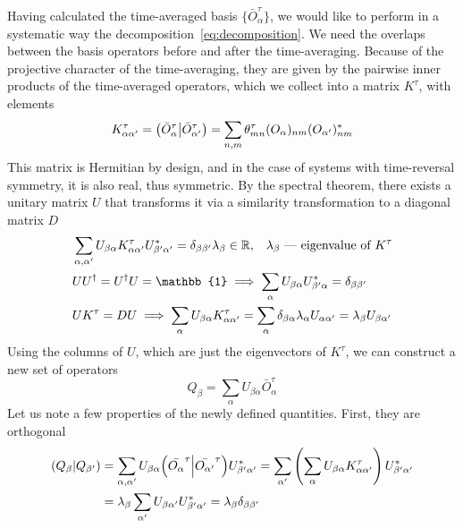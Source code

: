 Having calculated the time-averaged basis \( \{\bar{O}_{\alpha}^{\tau}\} \), we would like to perform in a 
systematic way the decomposition~\ref{eq:decomposition}. We need the overlaps between the basis operators
before and after the time-averaging. Because of the projective character of the time-averaging, they are
given by the pairwise inner products of the time-averaged operators, which we collect into a matrix
\(K^{\tau}\), with elements
\begin{equation}
    K^{\tau}_{\alpha\alpha^{\prime}} = \left(\bar{O}_{\alpha}^{\tau} \middle| \bar{O}_{\alpha^{\prime}}^{\tau}\right) = \sum_{n,m} \theta_{mn}^{\tau} (O_{\alpha})_{nm} (O_{\alpha^{\prime}})_{nm}^{\ast}
    \label{eq:overlap_matrix}
\end{equation}
This matrix is Hermitian by design, and in the case of systems with time-reversal symmetry, it is also real,
thus symmetric. By the spectral theorem, there exists a unitary matrix \(U\) that transforms it
via a similarity transformation to a diagonal matrix \(D\)
\begin{align}
    &\sum_{\alpha,\alpha^{\prime}} U_{\beta \alpha} K_{\alpha\alpha^{\prime}}^{\tau} U_{\beta^{\prime} \alpha^{\prime}}^{\ast}=\delta_{\beta\beta^{\prime}} \lambda_{\beta} \in
     \RR,\;\;\; \lambda_{\beta} \text{ --- eigenvalue of }K^{\tau} \label{eq:property diag} \\
    &UU^{\dag} = U^{\dag}U = \mathbb{1} \implies \sum_{\alpha} U_{\beta\alpha}U_{\beta^{\prime}\alpha}^{\ast} =
     \delta_{\beta\beta^{\prime}} \label{eq:propery_ortho}\\
    & U K^{\tau} = D U \implies \sum_{\alpha} U_{\beta\alpha} K_{\alpha\alpha^{\prime}}^{\tau} = \sum_{\alpha}  \delta_{\beta\alpha} \lambda_{\alpha} U_{\alpha\alpha^{\prime}} = \lambda_{\beta} U_{\beta\alpha^{\prime}}\label{eq:property}
  \end{align} 
Using the columns of \(U\), which are just the eigenvectors of \(K^{\tau}\), we can construct a new set of operators
\begin{equation}
    Q_{\beta} = \sum_{\alpha} U_{\beta \alpha} \bar{O}_{\alpha}^{\tau}
    \label{eq:liom}
\end{equation}
Let us note a few properties of the newly defined quantities. First, they are orthogonal
\begin{align}
    \left(Q_\beta \middle| Q_{\beta^{\prime}}\right) &= \sum_{\alpha,\alpha^{\prime}} U_{\beta\alpha} {\left(\bar{O_{\alpha}}^{\tau} \middle| \bar{O_{\alpha^{\prime}}}^{\tau}\right)} U_{\beta^{\prime}\alpha^{\prime}}^{\ast} 
    = \sum_{\alpha^{\prime}} \left(\sum_{\alpha}U_{\beta\alpha} K_{\alpha\alpha^{\prime}}^{\tau}\right)  U_{\beta^{\prime}{\alpha^{\prime}}}^{\ast}\nonumber \\ 
    &= \lambda_{\beta} \sum_{\alpha^{\prime}} U_{\beta\alpha^{\prime}} U_{\beta^{\prime}\alpha^{\prime}}^{\ast} = \lambda_{\beta} \delta_{\beta\beta^{\prime}}
  \end{align}

